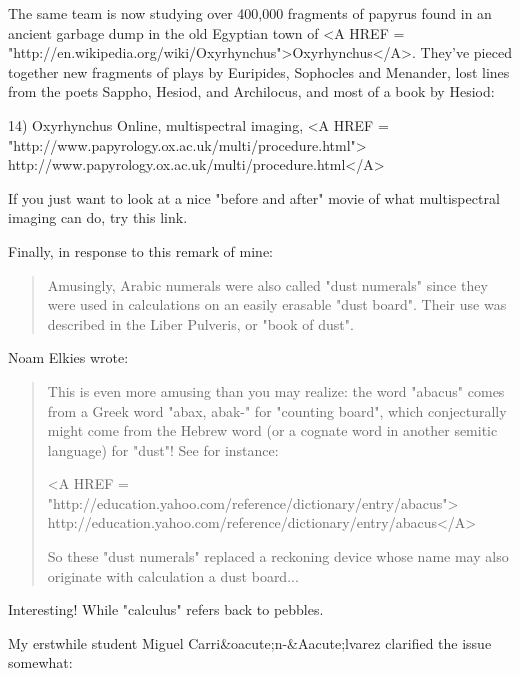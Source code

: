 The same team is now studying over 400,000 fragments of papyrus found 
in an ancient garbage dump in the old Egyptian town of 
<A HREF = "http://en.wikipedia.org/wiki/Oxyrhynchus">Oxyrhynchus</A>.  They've
pieced together new fragments of plays by Euripides, Sophocles and Menander,
lost lines from the poets Sappho, Hesiod, and Archilocus, and most of
a book by Hesiod:

14) Oxyrhynchus Online, multispectral imaging,
<A HREF = "http://www.papyrology.ox.ac.uk/multi/procedure.html">
http://www.papyrology.ox.ac.uk/multi/procedure.html</A>

If you just want to look at a nice "before and after" 
movie of what multispectral imaging can do, try this link.

Finally, in response to this remark of mine:

\begin{quote}
Amusingly, Arabic numerals were also called "dust numerals" since 
they were used in calculations on an easily erasable "dust board".
Their use was described in the Liber Pulveris, or "book of dust".
\end{quote}

Noam Elkies wrote:

\begin{quote}
This is even more amusing than you may realize: the word "abacus"
comes from a Greek word "abax, abak-" for "counting board", which
conjecturally might come from the Hebrew word (or a cognate word
in another semitic language) for "dust"!  See for instance:

<A HREF = "http://education.yahoo.com/reference/dictionary/entry/abacus">
http://education.yahoo.com/reference/dictionary/entry/abacus</A>

So these "dust numerals" replaced a reckoning device whose name
may also originate with calculation a dust board...
\end{quote}

Interesting!  While "calculus" refers back to pebbles.  

My erstwhile student
Miguel Carri&oacute;n-&Aacute;lvarez 
clarified the issue somewhat:

